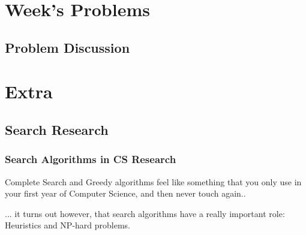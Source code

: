 \documentclass{beamer}
\begin{document}



\section{Week's Problems}
\subsection{Problem Discussion}




\section{Extra}
\subsection{Search Research}

\begin{frame}
  \frametitle{Search Algorithms in CS Research}

  Complete Search and Greedy algorithms feel like something that you
  only use in your first year of Computer Science, and then never
  touch again..

  \vfill

  ... it turns out however, that search algorithms have a really
  important role: Heuristics and NP-hard problems.
\end{frame}
\end{document}
